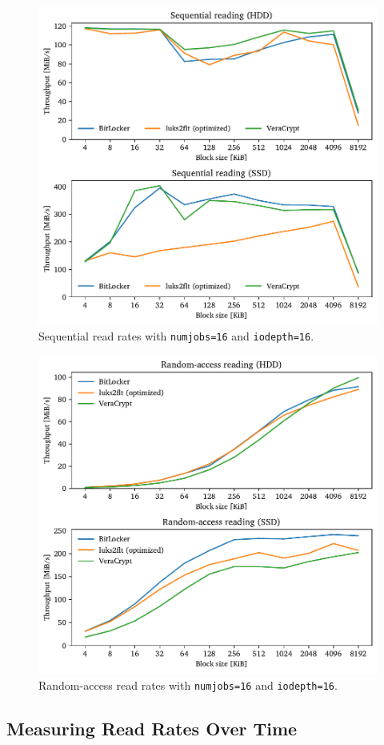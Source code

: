 \begin{figure}[htb!]
	\center
	\includegraphics[scale=1]{../fig/performance.hwexperiments.optseqthreadsqueue.pdf}
	\caption[
		Sequential read rates with \texttt{numjobs=16} and \texttt{iodepth=16}
	]{
		Sequential read rates with \texttt{numjobs=16} and \texttt{iodepth=16}. 
	}
	\label{fig:performance.hwexperiments.optseqthreadsqueue}
\end{figure}

\begin{figure}[htb!]
	\center
	\includegraphics[scale=1]{../fig/performance.hwexperiments.optrandthreadsqueue.pdf}
	\caption[
		Random-access read rates with \texttt{numjobs=16} and \texttt{iodepth=16}
	]{
		Random-access read rates with \texttt{numjobs=16} and \texttt{iodepth=16}. 
	}
	\label{fig:performance.hwexperiments.optrandthreadsqueue}
\end{figure}

\subsection{Measuring Read Rates Over Time}
\label{chap:performance.hwexperiments.readrateovertime}
